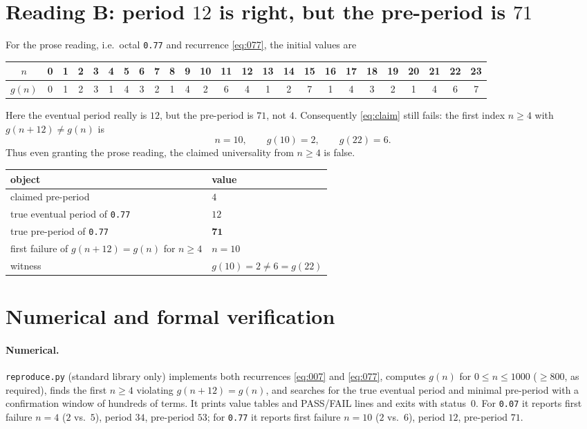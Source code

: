 \documentclass[11pt]{article}
\newcommand{\Sg}{g}
\begin{document}
\section{Reading B: period $12$ is right, but the pre-period is $71$}

For the prose reading, i.e.\ octal \texttt{0.77} and recurrence
\eqref{eq:077}, the initial values are
\begin{center}
\small
\setlength{\tabcolsep}{3.5pt}
\begin{tabular}{c|cccccccccccccccccccccccc}
$n$      & 0&1&2&3&4&5&6&7&8&9&10&11&12&13&14&15&16&17&18&19&20&21&22&23\\
\hline
$\Sg(n)$ & 0&1&2&3&1&4&3&2&1&4&2&6&4&1&2&7&1&4&3&2&1&4&6&7
\end{tabular}
\end{center}
Here the eventual period really is $12$, but the pre-period is $71$, not
$4$. Consequently \eqref{eq:claim} still fails: the first index
$n\ge4$ with $\Sg(n+12)\ne\Sg(n)$ is
\[
  n=10,\qquad \Sg(10)=2,\qquad \Sg(22)=6 .
\]
Thus even granting the prose reading, the claimed universality from
$n\ge4$ is false.

\begin{center}
\begin{tabular}{ll}
\hline
object & value \\
\hline
claimed pre-period & $4$ \\
true eventual period of \texttt{0.77} & $12$ \\
true pre-period of \texttt{0.77} & $\mathbf{71}$ \\
first failure of $\Sg(n+12)=\Sg(n)$ for $n\ge4$ & $n=10$ \\
witness & $\Sg(10)=2\ne6=\Sg(22)$ \\
\hline
\end{tabular}
\end{center}

\section{Numerical and formal verification}

\paragraph{Numerical.} \texttt{reproduce.py} (standard library only)
implements both recurrences \eqref{eq:007} and \eqref{eq:077}, computes
$\Sg(n)$ for $0\le n\le1000$ ($\ge 800$, as required), finds the first
$n\ge4$ violating $\Sg(n+12)=\Sg(n)$, and searches for the true eventual
period and minimal pre-period with a confirmation window of hundreds of
terms. It prints value tables and PASS/FAIL lines and exits with
status~$0$. For \texttt{0.07} it reports first failure $n=4$
($2$ vs.\ $5$), period $34$, pre-period $53$; for \texttt{0.77} it
reports first failure $n=10$ ($2$ vs.\ $6$), period $12$, pre-period
$71$.
\end{document}
